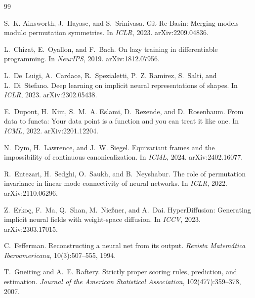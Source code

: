 \documentclass[10pt,letterpaper]{article}
\theoremstyle{definition}
\begin{document}
\small

\begin{thebibliography}{99}

S.~K. Ainsworth, J.~Hayase, and S.~Srinivasa.
\newblock Git Re-Basin: Merging models modulo permutation symmetries.
\newblock In \emph{ICLR}, 2023. arXiv:2209.04836.

L.~Chizat, E.~Oyallon, and F.~Bach.
\newblock On lazy training in differentiable programming.
\newblock In \emph{NeurIPS}, 2019. arXiv:1812.07956.

L.~De~Luigi, A.~Cardace, R.~Spezialetti, P.~Z. Ramirez, S.~Salti, and L.~Di~Stefano.
\newblock Deep learning on implicit neural representations of shapes.
\newblock In \emph{ICLR}, 2023. arXiv:2302.05438.

E.~Dupont, H.~Kim, S.~M.~A. Eslami, D.~Rezende, and D.~Rosenbaum.
\newblock From data to functa: Your data point is a function and you can treat it like one.
\newblock In \emph{ICML}, 2022. arXiv:2201.12204.

N.~Dym, H.~Lawrence, and J.~W. Siegel.
\newblock Equivariant frames and the impossibility of continuous canonicalization.
\newblock In \emph{ICML}, 2024. arXiv:2402.16077.

R.~Entezari, H.~Sedghi, O.~Saukh, and B.~Neyshabur.
\newblock The role of permutation invariance in linear mode connectivity of neural networks.
\newblock In \emph{ICLR}, 2022. arXiv:2110.06296.

Z.~Erko\c{c}, F.~Ma, Q.~Shan, M.~Nie\ss{}ner, and A.~Dai.
\newblock HyperDiffusion: Generating implicit neural fields with weight-space diffusion.
\newblock In \emph{ICCV}, 2023. arXiv:2303.17015.

C.~Fefferman.
\newblock Reconstructing a neural net from its output.
\newblock \emph{Revista Matem\'atica Iberoamericana}, 10(3):507--555, 1994.

T.~Gneiting and A.~E. Raftery.
\newblock Strictly proper scoring rules, prediction, and estimation.
\newblock \emph{Journal of the American Statistical Association}, 102(477):359--378, 2007.


\end{thebibliography}
\end{document}
